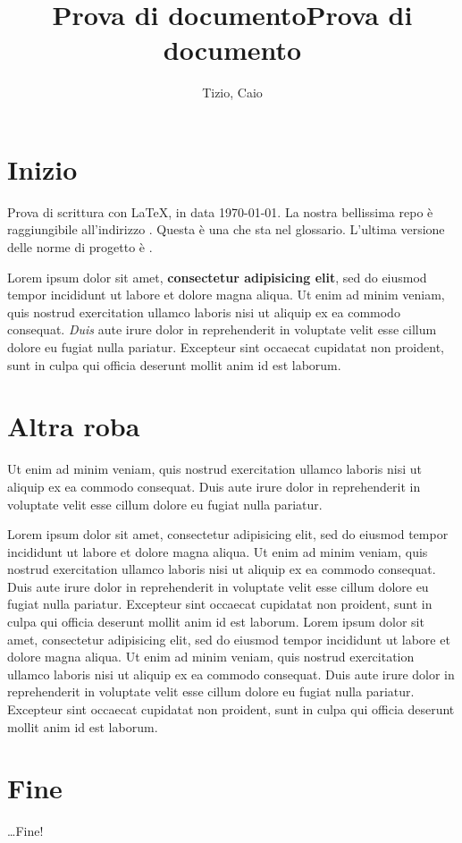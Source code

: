 


\author{Tizio, Caio}
\title{Prova di documento}
\title{Prova di documento}



\maketitle
\tableofcontents



\section{Inizio}

Prova di scrittura con \LaTeX, in data \today. La nostra bellissima repo è raggiungibile all'indirizzo \repo. Questa è una  che sta nel glossario. L'ultima versione delle norme di progetto è \NdP{}.

Lorem ipsum dolor sit amet, \textbf{consectetur adipisicing elit}, sed do eiusmod tempor incididunt ut labore et dolore magna aliqua. Ut enim ad minim veniam, quis nostrud exercitation ullamco laboris nisi ut aliquip ex ea commodo consequat. \textit{Duis} aute irure dolor in reprehenderit in voluptate velit esse cillum dolore eu fugiat nulla pariatur. Excepteur sint occaecat cupidatat non proident, sunt in culpa qui officia deserunt mollit anim id est laborum.



\section{Altra roba}

Ut enim ad minim veniam, quis nostrud exercitation ullamco laboris nisi ut aliquip ex ea commodo consequat. Duis aute irure dolor in reprehenderit in voluptate velit esse cillum dolore eu fugiat nulla pariatur.

Lorem ipsum dolor sit amet, consectetur adipisicing elit, sed do eiusmod tempor incididunt ut labore et dolore magna aliqua. Ut enim ad minim veniam, quis nostrud exercitation ullamco laboris nisi ut aliquip ex ea commodo consequat. Duis aute irure dolor in reprehenderit in voluptate velit esse cillum dolore eu fugiat nulla pariatur. Excepteur sint occaecat cupidatat non proident, sunt in culpa qui officia deserunt mollit anim id est laborum. Lorem ipsum dolor sit amet, consectetur adipisicing elit, sed do eiusmod tempor incididunt ut labore et dolore magna aliqua. Ut enim ad minim veniam, quis nostrud exercitation ullamco laboris nisi ut aliquip ex ea commodo consequat. Duis aute irure dolor in reprehenderit in voluptate velit esse cillum dolore eu fugiat nulla pariatur. Excepteur sint occaecat cupidatat non proident, sunt in culpa qui officia deserunt mollit anim id est laborum.



\section{Fine}

\dots Fine!




